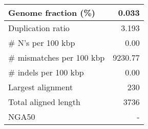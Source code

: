 \documentclass[12pt,a4paper]{article}
\begin{document}
\begin{table}[ht]
\begin{center}
\begin{tabular}{|l*{1}{|r}|}
Genome fraction (\%) & 0.033 \\ \hline
Duplication ratio & 3.193 \\ \hline
\# N's per 100 kbp & 0.00 \\ \hline
\# mismatches per 100 kbp & 9230.77 \\ \hline
\# indels per 100 kbp & 0.00 \\ \hline
Largest alignment & 230 \\ \hline
Total aligned length & 3736 \\ \hline
NGA50 & - \\ \hline
\end{tabular}
\end{center}
\end{table}
\end{document}
